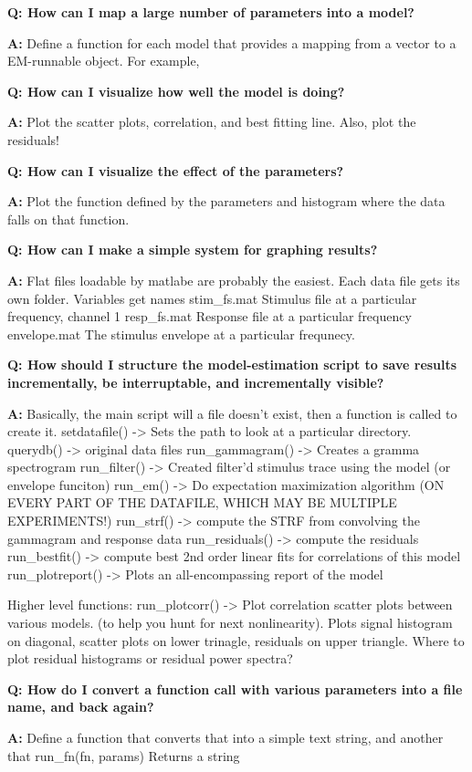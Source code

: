 \documentclass{article}
\newenvironment{qanda}{\setlength{\parindent}{0pt}}{\bigskip}
\newcommand{\Q}{\bigskip\bfseries Q: }
\newcommand{\A}{\par\textbf{A:} \normalfont}
\begin{document}
\begin{qanda}
\Q How can I map a large number of parameters into a model?
\A Define a function for each model that provides a mapping from a vector to a EM-runnable object.
   For example, 

\Q How can I visualize how well the model is doing?
\A Plot the scatter plots, correlation, and best fitting line. Also, plot the residuals!

\Q How can I visualize the effect of the parameters?
\A Plot the function defined by the parameters and histogram where the data falls on that function.

\Q How can I make a simple system for graphing results?
\A Flat files loadable by matlabe are probably the easiest. Each data file gets its own folder. Variables get names
   stim_fs.mat     Stimulus file at a particular frequency, channel 1
   resp_fs.mat     Response file at a particular frequency
   envelope.mat    The stimulus envelope at a particular frequnecy.
    
\Q How should I structure the model-estimation script to save results incrementally, be interruptable, and incrementally visible?
\A Basically, the main script will a file doesn't exist, then a function is called to create it. 
    setdatafile()    -> Sets the path to look at a particular directory.
    querydb()        -> original data files
    run_gammagram()  -> Creates a gramma spectrogram
    run_filter()     -> Created filter'd stimulus trace using the model (or envelope funciton)
    run_em()         -> Do expectation maximization algorithm (ON EVERY PART OF THE DATAFILE, WHICH MAY BE MULTIPLE EXPERIMENTS!)
    run_strf()       -> compute the STRF from convolving the gammagram and response data
    run_residuals()  -> compute the residuals
    run_bestfit()    -> compute best 2nd order linear fits for correlations of this model
    run_plotreport() -> Plots an all-encompassing report of the model

    Higher level functions:
    run_plotcorr()   -> Plot correlation scatter plots between various models. (to help you hunt for next nonlinearity). 
                        Plots signal histogram on diagonal, scatter plots on lower trinagle, residuals on upper triangle. 
                        Where to plot residual histograms or residual power spectra?

\Q How do I convert a function call with various parameters into a file name, and back again?
\A Define a function that converts that into a simple text string, and another that 
    run_fn(fn, params)     Returns a string
    

\end{qanda}
\end{document}
